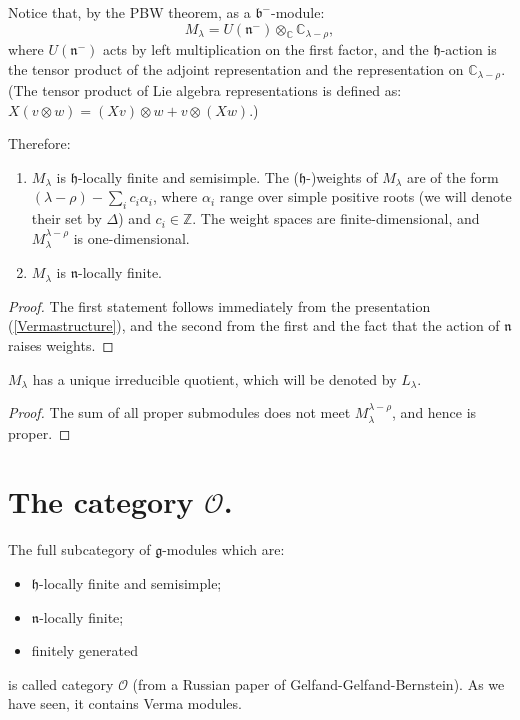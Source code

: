 Notice that, by the PBW theorem, as a $\mathfrak b^-$-module:
\begin{equation}\label{Vermastructure}M_\lambda = U(\mathfrak n^-)\otimes_{\mathbb C} \mathbb C_{\lambda-\rho},
\end{equation}
where $U(\mathfrak n^-)$ acts by left multiplication on the first factor, and the $\mathfrak h$-action is the tensor product of the adjoint representation and the representation on $\mathbb C_{\lambda-\rho}$. (The tensor product of Lie algebra representations is defined as: $X(v\otimes w) = (Xv)\otimes w+ v\otimes (Xw)$.)

Therefore:
\begin{lemma}
 \begin{enumerate}
  \item $M_\lambda$ is $\mathfrak h$-locally finite and semisimple. The ($\mathfrak h$-)weights of $M_\lambda$ are of the form $(\lambda-\rho) - \sum_i c_i\alpha_i$, where $\alpha_i$ range over simple positive roots (we will denote their set by $\Delta$) and $c_i\in \mathbb Z$. The weight spaces are finite-dimensional, and $M_\lambda^{\lambda-\rho}$ is one-dimensional.
 \item $M_\lambda$ is $\mathfrak n$-locally finite.
 \end{enumerate}
\end{lemma}

\begin{proof}
 The first statement follows immediately from the presentation (\ref{Vermastructure}), and the second from the first and the fact that the action of $\mathfrak n$ raises weights.
\end{proof}

\begin{proposition}\label{uniquequotient}
 $M_\lambda$ has a unique irreducible quotient, which will be denoted by $L_\lambda$. 
\end{proposition}

\begin{proof}
 The sum of all proper submodules does not meet $M_\lambda^{\lambda-\rho}$, and hence is proper.
\end{proof}

\section{The category $\mathcal O$.}

The full subcategory of $\mathfrak g$-modules which are:
\begin{itemize}
 \item $\mathfrak h$-locally finite and semisimple;
 \item $\mathfrak n$-locally finite;
 \item finitely generated
\end{itemize}
is called category $\mathcal O$ (from a Russian paper of Gelfand-Gelfand-Bernstein). As we have seen, it contains Verma modules. %

